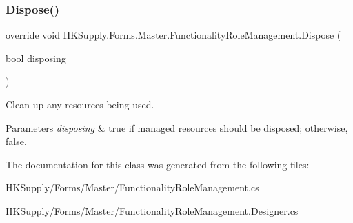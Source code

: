 \subsubsection{\texorpdfstring{Dispose()}{Dispose()}}
{\footnotesize\ttfamily override void H\+K\+Supply.\+Forms.\+Master.\+Functionality\+Role\+Management.\+Dispose (\begin{DoxyParamCaption}\item[{bool}]{disposing }\end{DoxyParamCaption})\hspace{0.3cm}{\ttfamily [protected]}}



Clean up any resources being used. 


\begin{DoxyParams}{Parameters}
{\em disposing} & true if managed resources should be disposed; otherwise, false.\\
\hline
\end{DoxyParams}


The documentation for this class was generated from the following files\+:\begin{DoxyCompactItemize}
\item 
H\+K\+Supply/\+Forms/\+Master/Functionality\+Role\+Management.\+cs\item 
H\+K\+Supply/\+Forms/\+Master/Functionality\+Role\+Management.\+Designer.\+cs\end{DoxyCompactItemize}
